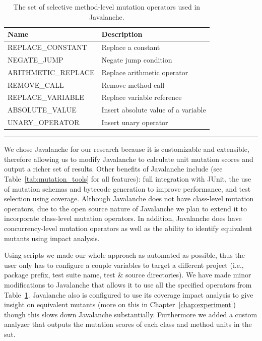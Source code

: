 \begin{table}[t]
  \centering
  \begin{tabular}{|l|l|}
    \hline
    \rowcolor[RGB]{169,196,223}
    \textbf{Name} & \textbf{Description} \\
    \hline REPLACE\_CONSTANT & Replace a constant \\
    \hline NEGATE\_JUMP & Negate jump condition \\
    \hline ARITHMETIC\_REPLACE & Replace arithmetic operator \\
    \hline REMOVE\_CALL & Remove method call \\
    \hline REPLACE\_VARIABLE & Replace variable reference\\
    \hline ABSOLUTE\_VALUE & Insert absolute value of a variable \\
    \hline UNARY\_OPERATOR & Insert unary operator \\
    \hline
  \end{tabular}
  \caption{The set of selective method-level mutation operators used in Javalanche.}
  \label{tab:javalanche_operators}
  \vspace{2mm}
  \hrule
\end{table}

We chose Javalanche for our research because it is customizable and extensible, therefore allowing us to modify Javalanche to calculate unit mutation scores and output a richer set of results. Other benefits of Javalanche include (see Table~\ref{tab:mutation_tools} for all features): full integration with JUnit, the use of mutation schemas and bytecode generation to improve performance, and test selection using coverage. Although Javalanche does not have class-level mutation operators, due to the open source nature of Javalanche we plan to extend it to incorporate class-level mutation operators. In addition, Javalanche does have concurrency-level mutation operators as well as the ability to identify equivalent mutants using impact analysis.

Using scripts we made our whole approach as automated as possible, thus the user only has to configure a couple variables to target a different project (i.e., package prefix, test suite name, test \& source directories). We have made minor modifications to Javalanche that allows it to use all the specified operators from Table~\ref{tab:javalanche_operators}. Javalanche also is configured to use its coverage impact analysis to give insight on equivalent mutants (more on this in Chapter~\ref{chap:experiment}) though this slows down Javalanche substantially. Furthermore we added a custom analyzer that outputs the mutation scores of each class and method units in the \gls{sut}.

